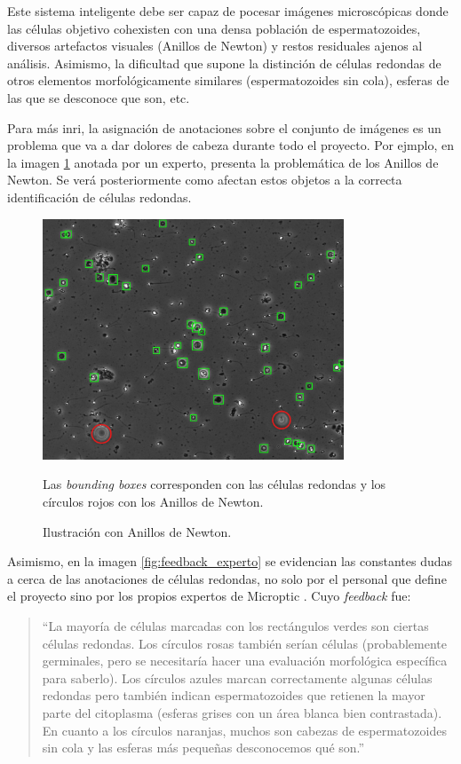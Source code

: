 \documentclass[12pt,a4paper,onecolumn,oneside]{report}
\begin{document}
Este sistema inteligente debe ser capaz de pocesar imágenes microscópicas donde las células objetivo cohexisten con una densa población de espermatozoides, diversos artefactos visuales (Anillos de Newton)
y restos residuales ajenos al análisis. Asimismo, la dificultad que supone la distinción de células redondas de otros elementos morfológicamente similares (espermatozoides sin cola), esferas de las que se desconoce que son, etc.

Para más inri, la asignación de anotaciones sobre el conjunto de imágenes es un problema que va a dar dolores de cabeza durante todo el proyecto. Por ejmplo,
en la imagen \ref{fig:Anillos_Newton} anotada por un experto, presenta la problemática de los Anillos de Newton. Se verá posteriormente como afectan estos objetos a la correcta identificación de células redondas.

\begin{figure}[htbp]
  \centering
  \includegraphics[width=0.8\textwidth]{figuras/rounds_cells/Anillos de Newton.png}
  \caption{Ilustración con Anillos de Newton.}
  \label{fig:Anillos_Newton}
  Las \textit{bounding boxes} corresponden con las células redondas y los círculos rojos con los Anillos de Newton.
\end{figure}

Asimismo, en la imagen \ref{fig:feedback_experto} se evidencian las constantes dudas a cerca de las anotaciones de células redondas, no solo por el personal que define el proyecto sino por los propios expertos de Microptic \cite{microptic}. 
Cuyo \textit{feedback} fue:

\begin{quote}
“La mayoría de células marcadas con los rectángulos verdes son ciertas células redondas. Los círculos rosas también serían células (probablemente germinales, pero se necesitaría hacer una evaluación morfológica específica para saberlo). Los círculos azules marcan correctamente algunas células redondas pero también indican espermatozoides que retienen la mayor parte del citoplasma (esferas grises con un área blanca bien contrastada). En cuanto a los círculos naranjas, muchos son cabezas de espermatozoides sin cola y las esferas más pequeñas desconocemos qué son.”
\end{quote}
\end{document}
